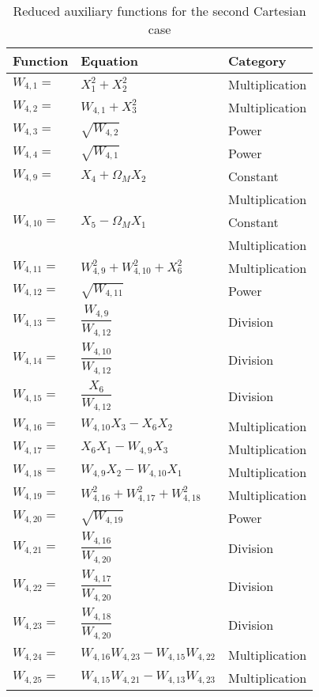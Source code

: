 \begin{longtable}{|p{1.5cm}|l|p{2cm}|}
\caption{Reduced auxiliary functions for the second Cartesian case}
\label{tab:auxFunc2}
\endfirsthead
\endhead
\hline
\textbf{Function} & \textbf{Equation} & \textbf{Category}  \\ \hline \hline
\hline 
$W_{4,1}=$ & $ X_{1}^{2}+X_{2}^{2} $ & Multiplication \\ \hline
$W_{4,2}=$ & $ W_{4,1}+X_{3}^{2} $ & Multiplication \\ \hline
$W_{4,3}=$ & $ \sqrt{W_{4,2}} $ & Power \\ \hline
$W_{4,4}=$ & $ \sqrt{W_{4,1}} $ & Power \\ \hline
$W_{4,9}=$ & $ X_{4}+\Omega_{M}X_{2} $ & Constant  \\ 
& & Multiplication \\ \hline
$W_{4,10}=$ & $ X_{5}-\Omega_{M}X_{1} $ & Constant  \\ 
& & Multiplication \\ \hline
$W_{4,11}=$ & $ W_{4,9}^{2}+W_{4,10}^{2}+X_{6}^{2} $ & Multiplication \\ \hline
$W_{4,12}=$ & $ \sqrt{W_{4,11}} $ & Power \\ \hline
$W_{4,13}=$ & $ \dfrac{W_{4,9}}{W_{4,12}} $ & Division \\ \hline
$W_{4,14}=$ & $ \dfrac{W_{4,10}}{W_{4,12}} $ & Division \\ \hline
$W_{4,15}=$ & $ \dfrac{X_{6}}{W_{4,12}} $ & Division \\ \hline
$W_{4,16}=$ & $ W_{4,10}X_{3}-X_{6}X_{2} $ & Multiplication \\ \hline
$W_{4,17}=$ & $ X_{6}X_{1}-W_{4,9}X_{3} $ & Multiplication \\ \hline
$W_{4,18}=$ & $ W_{4,9}X_{2}-W_{4,10}X_{1} $ & Multiplication \\ \hline
$W_{4,19}=$ & $ W_{4,16}^{2}+W_{4,17}^{2}+W_{4,18}^{2} $ & Multiplication \\ \hline
$W_{4,20}=$ & $ \sqrt{W_{4,19}} $ & Power \\ \hline
$W_{4,21}=$ & $ \dfrac{W_{4,16}}{W_{4,20}} $ & Division \\ \hline
$W_{4,22}=$ & $ \dfrac{W_{4,17}}{W_{4,20}} $ & Division \\ \hline
$W_{4,23}=$ & $ \dfrac{W_{4,18}}{W_{4,20}} $ & Division \\ \hline
$W_{4,24}=$ & $ W_{4,16}W_{4,23}-W_{4,15}W_{4,22} $ & Multiplication \\ \hline
$W_{4,25}=$ & $ W_{4,15}W_{4,21}-W_{4,13}W_{4,23} $ & Multiplication \\ \hline

\end{longtable}
